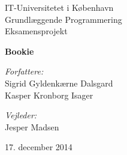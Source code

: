 
\begin{titlepage}

\center

\LARGE{IT-Universitetet i København}\\[1.5cm]
\Large{Grundlæggende Programmering}\\[0.5cm]
\large{Eksamensprojekt}

\vfill

\huge{\bfseries Bookie}

\vfill

\begin{minipage}[t]{0.4\textwidth}
\begin{flushleft} \large
  \emph{Forfattere:}\\
  Sigrid Gyldenkærne Dalsgard \\
  Kasper Kronborg Isager
\end{flushleft}
\end{minipage}
\begin{minipage}[t]{0.4\textwidth}
\begin{flushright} \large
  \emph{Vejleder:} \\
  Jesper Madsen
\end{flushright}
\end{minipage}

\vfill

\large{17. december 2014}

\end{titlepage}
